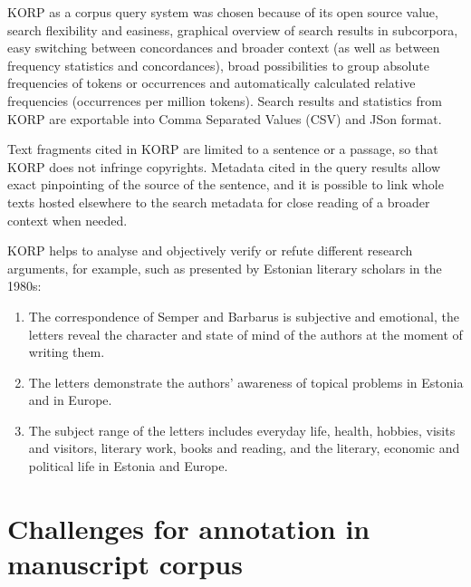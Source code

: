 \documentclass[runningheads]{llncs}
\begin{document}
KORP as a corpus query system was chosen because of its open source value, search flexibility and easiness, graphical overview of search results in subcorpora, easy switching between concordances and broader context (as well as between frequency statistics and concordances), broad possibilities to group absolute frequencies of tokens or occurrences and automatically calculated relative frequencies (occurrences per million tokens).  Search results and statistics from KORP are exportable into Comma Separated Values (CSV) and JSon format. 

Text fragments cited in KORP are limited to a sentence or a passage, so that KORP does not infringe copyrights. Metadata cited in the query results allow exact pinpointing of the source of the sentence, and it is possible to link whole texts hosted elsewhere to the search metadata for close reading of a broader context when needed. 

KORP helps to analyse and objectively verify or refute different research arguments, for example, such as presented by Estonian literary scholars in the 1980s:
\begin{enumerate}
\item The correspondence of Semper and Barbarus is subjective and emotional, the letters reveal the character and state of mind of the authors at the moment of writing them.

\item The letters demonstrate the authors’ awareness of topical problems in Estonia and in Europe.

\item The subject range of the letters includes everyday life, health, hobbies, visits and visitors, literary work, books and reading, and the literary, economic and political life in Estonia and Europe.
\end{enumerate}

\section{Challenges for annotation in manuscript corpus}
\end{document}
